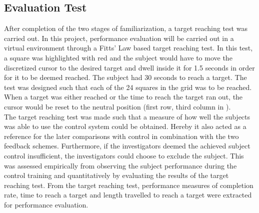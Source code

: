 \subsection{Evaluation Test} \label{sec:meth:contest}

After completion of the two stages of familiarization, a target reaching test was carried out. In this project, performance evaluation will be carried out in a virtual environment through a Fitts' Law based target reaching test. In this test, a square was highlighted with red and the subject would have to move the discretized cursor to the desired target and dwell inside it for 1.5 seconds in order for it to be deemed reached. The subject had 30 seconds to reach a target. The test was designed such that each of the 24 squares in the grid was to be reached. When a target was either reached or the time to reach the target ran out, the cursor would be reset to the neutral position (first row, third column in ). \\
The target reaching test was made such that a measure of how well the subjects was able to use the control system could be obtained. Hereby it also acted as a reference for the later comparisons with control in combination with the two feedback schemes. Furthermore, if the investigators deemed the achieved subject control insufficient, the investigators could choose to exclude the subject. This was assessed empirically from observing the subject performance during the control training and quantitatively by evaluating the results of the target reaching test. From the target reaching test, performance measures of completion rate, time to reach a target and length travelled to reach a target were extracted for performance evaluation.


